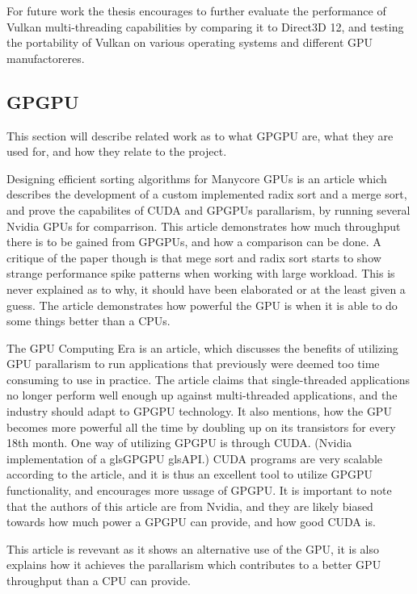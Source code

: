 For future work the thesis encourages to further evaluate the performance of Vulkan multi-threading  capabilities by comparing it to Direct3D 12, and testing the portability of Vulkan on various operating systems and different \gls{GPU} manufactoreres.

\subsection{\gls{GPGPU}}
This section will describe related work as to what GP\gls{GPU} are, what they are used for, and how they relate to the project.

Designing efficient sorting algorithms for Manycore \glspl{GPU} \cite{satish_2009_designing} is an article which describes the development of a custom implemented radix sort and a merge sort, and prove the capabilites of CUDA and \glspl{GPGPU} parallarism, by running several Nvidia \glspl{GPU} for comparrison. 
This article demonstrates how much throughput there is to be gained from \glspl{GPGPU}, and how a comparison can be done. 
A critique of the paper though is that mege sort and radix sort starts to show strange performance spike patterns when working with large workload. 
This is never explained as to why, it should have been elaborated or at the least given a guess.
The article demonstrates how powerful the \gls{GPU} is when it is able to do some things better than a \glspl{CPU}.

The GPU Computing Era \cite{gpu_computing_era} is an article, which discusses the benefits of utilizing \gls{GPU} parallarism to run applications that previously were deemed too time consuming to use in practice. 
The article claims that single-threaded applications no longer perform well enough up against multi-threaded applications, and the industry should adapt to GP\gls{GPU} technology. 
It also mentions, how the \gls{GPU} becomes more powerful all the time by doubling up on its transistors for every 18th month. 
One way of utilizing \gls{GPGPU} is through CUDA. (Nvidia implementation of a gls{GPGPU} gls{API}.)
CUDA programs are very scalable according to the article, and it is thus an excellent tool to utilize \gls{GPGPU} functionality, and encourages more ussage of \gls{GPGPU}.
It is important to note that the authors of this article are from Nvidia, and they are likely biased towards how much power a \gls{GPGPU} can provide, and how good CUDA is. 

This article is revevant as it shows an alternative use of the \gls{GPU}, it is also explains how it achieves the parallarism which contributes to a better \gls{GPU} throughput than a \gls{CPU} can provide.

